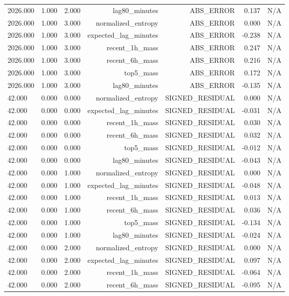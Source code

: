 \begin{table}[h!]
\begin{tabular}{lrrrrrr}
2026.000 & 1.000 & 2.000 & lag80\_minutes & ABS\_ERROR & 0.137 & N/A \\
2026.000 & 1.000 & 3.000 & normalized\_entropy & ABS\_ERROR & 0.000 & N/A \\
2026.000 & 1.000 & 3.000 & expected\_lag\_minutes & ABS\_ERROR & -0.238 & N/A \\
2026.000 & 1.000 & 3.000 & recent\_1h\_mass & ABS\_ERROR & 0.247 & N/A \\
2026.000 & 1.000 & 3.000 & recent\_6h\_mass & ABS\_ERROR & 0.216 & N/A \\
2026.000 & 1.000 & 3.000 & top5\_mass & ABS\_ERROR & 0.172 & N/A \\
2026.000 & 1.000 & 3.000 & lag80\_minutes & ABS\_ERROR & -0.135 & N/A \\
42.000 & 0.000 & 0.000 & normalized\_entropy & SIGNED\_RESIDUAL & 0.000 & N/A \\
42.000 & 0.000 & 0.000 & expected\_lag\_minutes & SIGNED\_RESIDUAL & -0.031 & N/A \\
42.000 & 0.000 & 0.000 & recent\_1h\_mass & SIGNED\_RESIDUAL & 0.030 & N/A \\
42.000 & 0.000 & 0.000 & recent\_6h\_mass & SIGNED\_RESIDUAL & 0.032 & N/A \\
42.000 & 0.000 & 0.000 & top5\_mass & SIGNED\_RESIDUAL & -0.012 & N/A \\
42.000 & 0.000 & 0.000 & lag80\_minutes & SIGNED\_RESIDUAL & -0.043 & N/A \\
42.000 & 0.000 & 1.000 & normalized\_entropy & SIGNED\_RESIDUAL & 0.000 & N/A \\
42.000 & 0.000 & 1.000 & expected\_lag\_minutes & SIGNED\_RESIDUAL & -0.048 & N/A \\
42.000 & 0.000 & 1.000 & recent\_1h\_mass & SIGNED\_RESIDUAL & 0.013 & N/A \\
42.000 & 0.000 & 1.000 & recent\_6h\_mass & SIGNED\_RESIDUAL & 0.036 & N/A \\
42.000 & 0.000 & 1.000 & top5\_mass & SIGNED\_RESIDUAL & -0.134 & N/A \\
42.000 & 0.000 & 1.000 & lag80\_minutes & SIGNED\_RESIDUAL & -0.024 & N/A \\
42.000 & 0.000 & 2.000 & normalized\_entropy & SIGNED\_RESIDUAL & 0.000 & N/A \\
42.000 & 0.000 & 2.000 & expected\_lag\_minutes & SIGNED\_RESIDUAL & 0.097 & N/A \\
42.000 & 0.000 & 2.000 & recent\_1h\_mass & SIGNED\_RESIDUAL & -0.064 & N/A \\
42.000 & 0.000 & 2.000 & recent\_6h\_mass & SIGNED\_RESIDUAL & -0.095 & N/A \\

\end{tabular}
\end{table}
